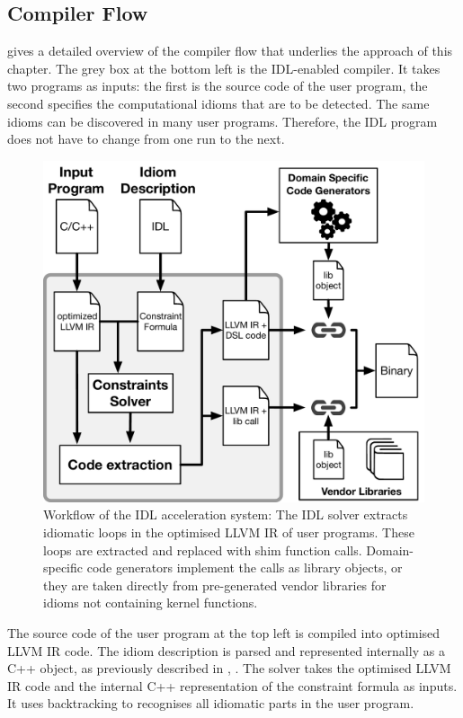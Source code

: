 \subsection{Compiler Flow}

     gives a detailed overview of the compiler flow that
    underlies the approach of this chapter.
    The grey box at the bottom left is the IDL-enabled compiler.
    It takes two programs as inputs: the first is the source code of
    the user program, the second specifies the computational idioms that are to
    be detected.
    The same idioms can be discovered in many user programs.
    Therefore, the IDL program does not have to change from one run to the next.

\begin{figure}[p]
    \centering
    \includegraphics[width=\linewidth]{figures/compiler_flow.pdf}
    \caption{Workflow of the IDL acceleration system:
             The IDL solver extracts idiomatic loops in the optimised LLVM IR
             of user programs.
             These loops are extracted and replaced with shim function calls.
             Domain-specific code generators implement the calls as library
             objects, or they are taken directly from pre-generated vendor
             libraries for idioms not containing kernel functions.}
    \label{fig:methodology}
\end{figure}

    The source code of the user program at the top left is compiled into
    optimised LLVM IR code.
    The idiom description is parsed and represented internally as a C++
    object, as previously described in ,
    .
    The solver takes the optimised LLVM IR code and the internal C++
    representation of the constraint formula as inputs.
    It uses backtracking to recognises all idiomatic parts in the user program.

